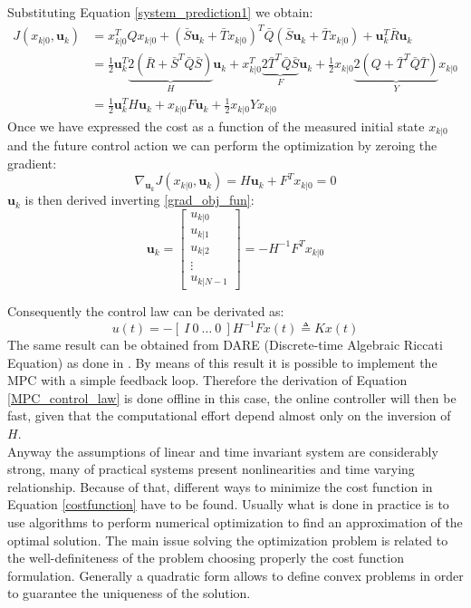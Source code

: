 Substituting Equation \eqref{system_prediction1} we obtain:
\begin{equation}
\begin{split} \label{costfunction_expr}
 J(x_{k|0},\textbf{u}_k)&=x_{k|0}^T Q x_{k|0} + (\bar{S}\textbf{u}_k+\bar{T}x_{k|0})^T\bar{Q}(\bar{S}\textbf{u}_k+\bar{T}x_{k|0}) + \textbf{u}_k^T\bar{R}\textbf{u}_k \\ 
 &= \frac{1}{2}\textbf{u}_k^T \underbrace{2(\bar{R}+\bar{S}^T\bar{Q}\bar{S})}_{H}\textbf{u}_k + x_{k|0}^T\underbrace{2\bar{T}^T\bar{Q}\bar{S}}_{F}\textbf{u}_k+\frac{1}{2}x_{k|0}\underbrace{2(Q+\bar{T}^T\bar{Q}\bar{T})}_{Y}x_{k|0} \\
 &=\frac{1}{2}\textbf{u}_k^TH\textbf{u}_k+x_{k|0}F\textbf{u}_k+\frac{1}{2}x_{k|0}Yx_{k|0}
 \end{split}
\end{equation}
Once we have expressed the cost as a function of the measured initial state $x_{k|0}$ and the future control action we can perform the optimization by zeroing the gradient:
\begin{equation}\label{grad_obj_fun}
	\nabla_{\textbf{u}_k}J(x_{k|0},\textbf{u}_k)=H\textbf{u}_k+F^Tx_{k|0}=0
\end{equation}
$\textbf{u}_k$ is then derived inverting \eqref{grad_obj_fun}:
\begin{equation}\label{MPC_control_law}
	\textbf{u}_k= \left[
	\begin{matrix}
			u_{k|0} \\ u_{k|1} \\ u_{k|2} \\ \vdots \\ u_{k|N-1}
	\end{matrix}\right] = -H^{-1}F^Tx_{k|0}
\end{equation} 

Consequently the control law can be derivated as:
\begin{equation}
u(t)=-\left[\ I\ 0\ \dots\  0\ \right]H^{-1}Fx(t)\triangleq Kx(t)
\end{equation}
The same result can be obtained from DARE (Discrete-time Algebraic Riccati Equation) as done in \cite{magni2006complementi}.
By means of this result it is possible to implement the MPC with a simple feedback loop. Therefore the derivation of Equation \eqref{MPC_control_law} is done offline in this case, the online controller will then be fast, given that the computational effort depend almost only on the inversion of $H$. \\
Anyway the assumptions of linear and time invariant system are considerably strong, many of practical systems present nonlinearities and time varying relationship. Because of that, different ways to minimize the cost function in Equation \eqref{costfunction} have to be found.
Usually what is done in practice is to use algorithms to perform numerical optimization to find an approximation of the optimal solution. The main issue solving the optimization problem is related to the well-definiteness of the problem choosing properly the cost function formulation. Generally a quadratic form allows to define convex problems in order to guarantee the uniqueness of the solution.

